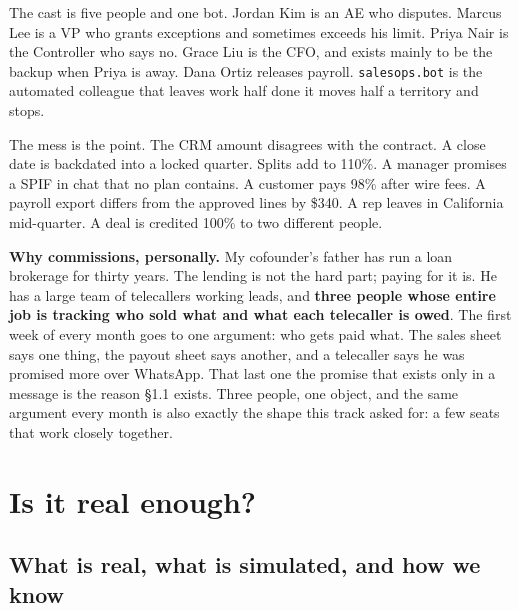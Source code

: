 \documentclass[10pt,a4paper]{article}
\newcommand{\code}[1]{{\small\texttt{#1}}}
\begin{document}
The cast is five people and one bot. Jordan Kim is an AE who disputes. Marcus Lee is a VP who grants exceptions and sometimes exceeds his limit. Priya Nair is the Controller who says no. Grace Liu is the CFO, and exists mainly to be the backup when Priya is away. Dana Ortiz releases payroll. \code{salesops.bot} is the automated colleague that leaves work half done \textemdash{} it moves half a territory and stops.

The mess is the point. The CRM amount disagrees with the contract. A close date is backdated into a locked quarter. Splits add to 110\%. A manager promises a SPIF in chat that no plan contains. A customer pays 98\% after wire fees. A payroll export differs from the approved lines by \$340. A rep leaves in California mid-quarter. A deal is credited 100\% to two different people.

\begin{callout}
\textbf{Why commissions, personally.} My cofounder's father has run a loan brokerage for thirty years. The lending is not the hard part; paying for it is. He has a large team of telecallers working leads, and \textbf{three people whose entire job is tracking who sold what and what each telecaller is owed}. The first week of every month goes to one argument: who gets paid what. The sales sheet says one thing, the payout sheet says another, and a telecaller says he was promised more over WhatsApp. That last one \textemdash{} the promise that exists only in a message \textemdash{} is the reason \S1.1 exists. Three people, one object, and the same argument every month is also exactly the shape this track asked for: a few seats that work closely together.
\end{callout}

\section{Is it real enough?}

\subsection{What is real, what is simulated, and how we know}
\end{document}
